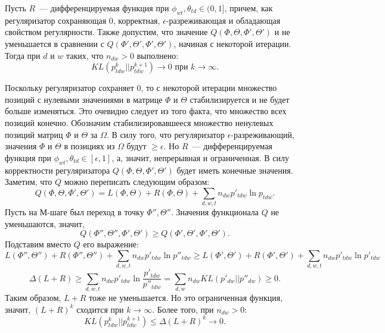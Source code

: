 \documentclass[12pt, twoside]{article}
\begin{document}
\begin{Theorem} \label{Theorem_neighbour_zero1} Пусть $R$~--- дифференцируемая функция при $\phi_{wt}, \theta_{td} \in (0, 1]$, причем, как регуляризатор сохраняющая 0, корректная, $\epsilon$-разреживающая и обладающая свойством регулярности. Также допустим,  что значение $Q(\Phi, \Theta, \Phi', \Theta')$  и не уменьшается в сравнении с $Q(\Phi', \Theta', \Phi', \Theta')$, начиная с некоторой итерации. Тогда при $d$ и $w$ таких, что $n_{dw} > 0$ выполнено:
\[
KL(p_{tdw}^{k}||p_{tdw}^{k+1}) \to 0 \text{ при }  k \to \infty.
\]
\end{Theorem}
\begin{Proof}
Поскольку регуляризатор сохраняет 0, то с некоторой итерации множество позиций с нулевыми значениями в матрице $\Phi$ и $\Theta$ стабилизируется и не будет больше изменяться. Это очевидно следует из того факта, что  множество всех позиций конечно. Обозначим стабилизировавшееся множество ненулевых позиций матриц $\Phi$ и $\Theta$ за $\Omega$. В силу того, что регуляризатор $\epsilon$-разреживающий, значения $\Phi$ и $\Theta$ в позициях из $\Omega$ будут $\geq \epsilon$. Но $R$~--- дифференцируемая функция при $\phi_{wt}, \theta_{td} \in [\epsilon, 1]$, а, значит, непрерывная и ограниченная. В силу корректности регуляризатора $Q(\Phi, \Theta, \Phi', \Theta')$  будет иметь конечные значения.
Заметим, что $Q$ можно переписать следующим образом:
\[
Q(\Phi, \Theta, \Phi', \Theta') = L(\Phi, \Theta) +  R(\Phi, \Theta) + \sum\limits_{d, w, t} n_{dw} p'_{tdw} \ln{p_{tdw}}.
\]
Пусть на М-шаге был переход в точку $\Phi'', \Theta''$. Значения функционала $Q$ не уменьшаются, значит,
\[
	Q(\Phi'', \Theta'', \Phi', \Theta') \geq Q(\Phi', \Theta', \Phi', \Theta').
\]
Подставим вместо $Q$ его выражение:
\[
	L(\Phi'', \Theta'') + R(\Phi'', \Theta'') + \sum\limits_{d, w, t} n_{dw} p'_{tdw} \ln{p''_{tdw}}  \geq L(\Phi', \Theta') +  R(\Phi', \Theta') + \sum\limits_{d, w, t} n_{dw} p'_{tdw} \ln{p'_{tdw}}
\]
\[
	\Delta(L +  R) \geq  \sum\limits_{d, w, t} n_{dw} p'_{tdw} \ln{\frac{p'_{tdw}}{p''_{tdw}}} = \sum\limits_{d, w} n_{dw} KL(p'_{dw} || p''_{dw}) \geq 0.
\]
Таким образом, $L +  R$  тоже не уменьшается. Но это ограниченная функция, значит, $(L + R)^{k}$ сходится при $k \to \infty$. Более того, при $n_{dw} > 0$:
\[
	KL(p_{tdw}^{k}||p_{tdw}^{k+1}) \leq \Delta (L +  R)^{k} \to 0.
\]
\end{Proof}
\end{document}
